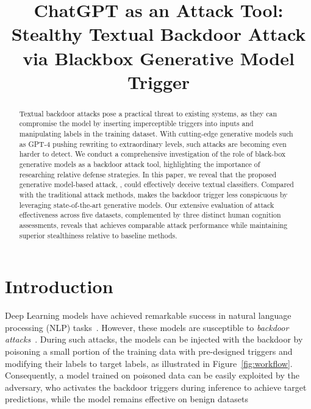 \title{ChatGPT as an Attack Tool: Stealthy Textual Backdoor Attack via Blackbox Generative Model Trigger}



\maketitle

\begin{abstract}

Textual backdoor attacks pose a practical threat to existing systems, as they can compromise the model by inserting imperceptible triggers into inputs and manipulating labels in the training dataset. With cutting-edge generative models such as GPT-4 pushing rewriting to extraordinary levels, such attacks are becoming even harder to detect. We conduct a comprehensive investigation of the role of black-box generative models as a backdoor attack tool, highlighting the importance of researching relative defense strategies. In this paper, we reveal that the proposed generative model-based attack, \method, could effectively deceive textual classifiers. Compared with the traditional attack methods, \method makes the backdoor trigger less conspicuous by leveraging state-of-the-art generative models. Our extensive evaluation of attack effectiveness across five datasets, complemented by three distinct human cognition assessments, reveals that \method achieves comparable attack performance while maintaining superior stealthiness relative to baseline methods. 

\end{abstract}\section{Introduction}\label{sec:Introduction}
Deep Learning models have achieved remarkable success in natural language processing (NLP) tasks~\cite{devlin-etal-2019-bert, lewis-etal-2020-bart, radford2019language, xue2020mt5, 2020t5, brown2020language, openai2023gpt4}. However, these models are susceptible to \emph{backdoor attacks}~\cite{gu2017badnets, chen2017targeted, liu2017trojaning, kurita2020weight, qi2021hidden}.  During such attacks, the models can be injected with the backdoor by poisoning a small portion of the training data with pre-designed triggers and modifying their labels to target labels, as illustrated in Figure~\ref{fig:workflow}. Consequently, a model trained on poisoned data can be easily exploited by the adversary, who activates the backdoor triggers during inference to achieve target predictions, while the model remains effective on benign datasets 

